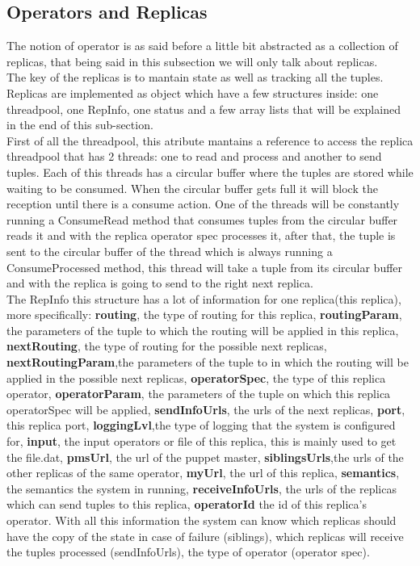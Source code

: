 \documentclass[times, 10pt, twocolumn]{article}
\begin{document}
\subsection{Operators and Replicas}
The notion of operator is as said before a little bit abstracted as a collection of replicas, that being said in this subsection we will only talk about replicas. 
\\The key of the replicas is to mantain state as well as tracking all the tuples.
\\Replicas are implemented as object which have a few structures inside: one threadpool, one RepInfo, one status and a few array lists that will be explained in the end of this sub-section.
\\First of all the threadpool, this atribute mantains a reference to access the replica threadpool that has 2 threads: one to read and process and another to send tuples. Each of this threads has a circular buffer where the tuples are stored while waiting to be consumed. When the circular buffer gets full it will block the reception until there is a consume action. One of the threads will be constantly running a ConsumeRead method that consumes tuples from the circular buffer reads it and with the replica operator spec processes it, after that, the tuple is sent to the circular buffer of the thread which is always running a ConsumeProcessed method, this thread will take a tuple from its circular buffer and with the replica is going to send to the right next replica.
\\The RepInfo this structure has a lot of information for one replica(this replica), more specifically: \textbf{routing}, the type of routing for this replica, \textbf{routingParam}, the parameters of the tuple to which the routing will be applied in this replica, \textbf{nextRouting}, the type of routing for the possible next replicas, \textbf{nextRoutingParam},the parameters of the tuple to in which the routing will be applied in the possible next replicas, \textbf{operatorSpec}, the type of this replica operator, \textbf{operatorParam}, the parameters of the tuple on which this replica operatorSpec will be applied, \textbf{sendInfoUrls}, the urls of the next replicas, \textbf{port}, this replica port, \textbf{loggingLvl},the type of logging that the system is configured for, \textbf{input}, the input operators or file of this replica, this is mainly used to get the file.dat, \textbf{pmsUrl}, the url of the puppet master, \textbf{siblingsUrls},the urls of the other replicas of the same operator,  \textbf{myUrl}, the url of this replica,   \textbf{semantics}, the semantics the system in running,  \textbf{receiveInfoUrls}, the urls of the replicas which can send tuples to this replica, \textbf{operatorId} the id of this replica's operator. With all this information the system can know which replicas should have the copy of the state in case of failure (siblings), which replicas will receive the tuples processed (sendInfoUrls), the type of operator (operator spec).
\end{document}

